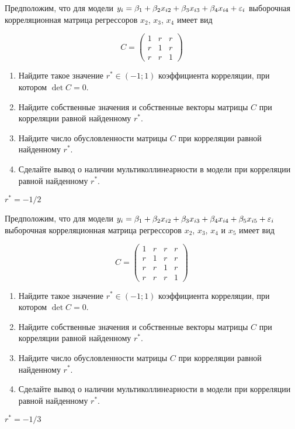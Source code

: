 \begin{problem}
Предположим, что для модели $y_i= \beta_1 + \beta_2 x_{i2} + \beta_3 x_{i3} + \beta_4 x_{i4}  + \varepsilon_i$ выборочная корреляционная матрица регрессоров $x_2$, $x_3$, $x_4$ имеет вид

\[
C =
\begin{pmatrix}
1 & r & r  \\
r & 1 & r  \\
r & r & 1
\end{pmatrix}
\]


\begin{enumerate}
\item Найдите такое значение $r^* \in (-1;1)$ коэффициента корреляции, при котором $\det C = 0$.
\item Найдите собственные значения и собственные векторы матрицы $C$ при корреляции равной найденному $r^*$.
\item Найдите число обусловленности матрицы $C$ при корреляции равной найденному $r^*$.
\item Сделайте вывод о наличии мультиколлинеарности в модели при корреляции равной найденному $r^*$.
\end{enumerate}


\begin{sol}
$r^* = -1/2$
\end{sol}
\end{problem}





\begin{problem}
Предположим, что для модели $y_i= \beta_1 + \beta_2 x_{i2} + \beta_3 x_{i3} + \beta_4 x_{i4} + \beta_5 x_{i5} + \varepsilon_i$ выборочная корреляционная матрица регрессоров $x_2$, $x_3$, $x_4$ и $x_5$ имеет вид

\[
C =
\begin{pmatrix}
1 & r & r & r \\
r & 1 & r & r \\
r & r & 1 & r \\
r & r & r & 1
\end{pmatrix}
\]


\begin{enumerate}
\item Найдите такое значение $r^* \in (-1;1)$ коэффициента корреляции, при котором $\det C = 0$.
\item Найдите собственные значения и собственные векторы матрицы $C$ при корреляции равной найденному $r^*$.
\item Найдите число обусловленности матрицы $C$ при корреляции равной найденному $r^*$.
\item Сделайте вывод о наличии мультиколлинеарности в модели при корреляции равной найденному $r^*$.
\end{enumerate}


\begin{sol}
$r^* = -1/3$
\end{sol}
\end{problem}


